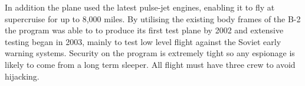 \documentclass{amsart}
\begin{document}
\begin{multicols}{3}
In addition the plane used the latest pulse-jet engines, enabling it
to fly at supercruise for up to 8,000 miles.  By utilising the
existing body frames of the B-2 the program was able to to produce its
first test plane by 2002 and extensive testing began in 2003, mainly
to test low level flight against the Soviet early warning systems.
Security on the program is extremely tight so any espionage is likely
to come from a long term sleeper.  All flight must have three crew
to avoid hijacking.

\end{multicols}
\end{document}
